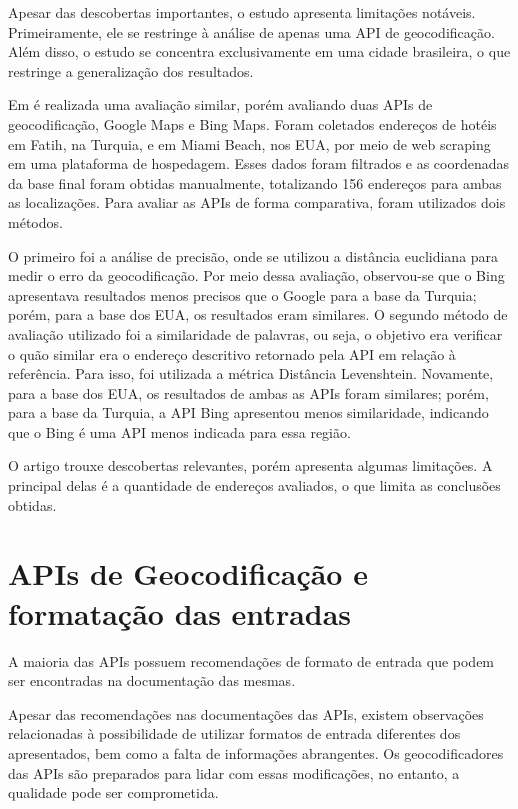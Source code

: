 Apesar das descobertas importantes, o estudo apresenta limitações notáveis. Primeiramente, ele se restringe à análise de apenas uma API de geocodificação. Além disso, o estudo se concentra exclusivamente em uma cidade brasileira, o que restringe a generalização dos resultados. 

Em \cite{kilic2020} é realizada uma avaliação similar, porém avaliando duas APIs de geocodificação, Google Maps e Bing Maps. Foram coletados endereços de hotéis em Fatih, na Turquia, e em Miami Beach, nos EUA, por meio de web scraping em uma plataforma de hospedagem. Esses dados foram filtrados e as coordenadas da base final foram obtidas manualmente, totalizando 156 endereços para ambas as localizações. Para avaliar as APIs de forma comparativa, foram utilizados dois métodos.

O primeiro foi a análise de precisão, onde se utilizou a distância euclidiana para medir o erro da geocodificação. Por meio dessa avaliação, observou-se que o Bing apresentava resultados menos precisos que o Google para a base da Turquia; porém, para a base dos EUA, os resultados eram similares. O segundo método de avaliação utilizado foi a similaridade de palavras, ou seja, o objetivo era verificar o quão similar era o endereço descritivo retornado pela API em relação à referência. Para isso, foi utilizada a métrica Distância Levenshtein. Novamente, para a base dos EUA, os resultados de ambas as APIs foram similares; porém, para a base da Turquia, a API Bing apresentou menos similaridade, indicando que o Bing é uma API menos indicada para essa região.

O artigo trouxe descobertas relevantes, porém apresenta algumas limitações. A principal delas é a quantidade de endereços avaliados, o que limita as conclusões obtidas. 


\section{APIs de Geocodificação e  formatação das entradas}

A maioria das APIs possuem recomendações de formato de entrada que podem ser encontradas na documentação das mesmas. 

Apesar das recomendações nas documentações das APIs, existem observações relacionadas à possibilidade de utilizar formatos de entrada diferentes dos apresentados, bem como a falta de informações abrangentes. Os geocodificadores das APIs são preparados para lidar com essas modificações, no entanto, a qualidade pode ser comprometida.

